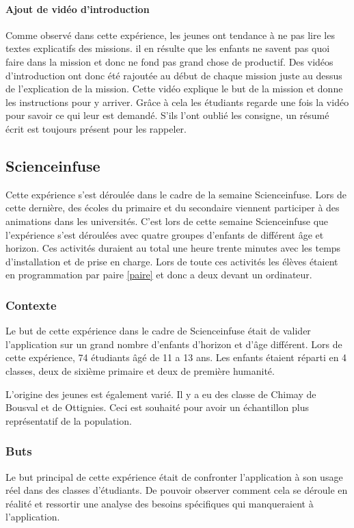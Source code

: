 \paragraph{Ajout de vidéo d'introduction}
Comme observé dans cette expérience, les jeunes ont tendance à ne pas lire les textes explicatifs des missions. il en  résulte que les enfants ne savent pas quoi faire dans la mission et donc ne fond pas grand chose de productif. Des vidéos d'introduction ont donc été rajoutée au début de chaque mission juste au dessus de l'explication de la mission. Cette vidéo explique le but de la mission et donne les instructions pour y arriver. Grâce à cela les étudiants regarde une fois la vidéo pour savoir ce qui leur est demandé. S'ils l'ont oublié les consigne, un résumé écrit est toujours présent pour les rappeler.


\subsection{Scienceinfuse}
Cette expérience s'est déroulée dans le cadre de la semaine Scienceinfuse. Lors de cette dernière, des écoles du primaire et du secondaire viennent participer à des animations dans les universités. C'est lors de cette semaine Scienceinfuse que l'expérience s'est déroulées avec quatre groupes d'enfants de différent âge et horizon. Ces activités duraient au total une heure trente minutes avec les temps d'installation et de prise en charge. Lors de toute ces activités les élèves étaient en programmation par paire \ref{paire} et donc a deux devant un ordinateur. %

\subsubsection{Contexte}
Le but de cette expérience dans le cadre de Scienceinfuse était de valider l'application sur un grand nombre d'enfants d'horizon et d'âge différent. Lors de cette expérience, 74 étudiants âgé de 11 a 13 ans. Les enfants étaient réparti en 4 classes, deux de sixième primaire et deux de première humanité.

L'origine des jeunes est également varié. Il y a eu des classe de Chimay de Bousval et de Ottignies. Ceci est souhaité pour avoir un échantillon plus représentatif de la population.

\subsubsection{Buts}
Le but principal de cette expérience était de confronter l'application à son usage réel dans des classes d'étudiants. De pouvoir observer comment cela se déroule en réalité et ressortir une analyse des besoins spécifiques qui manqueraient à l'application.

